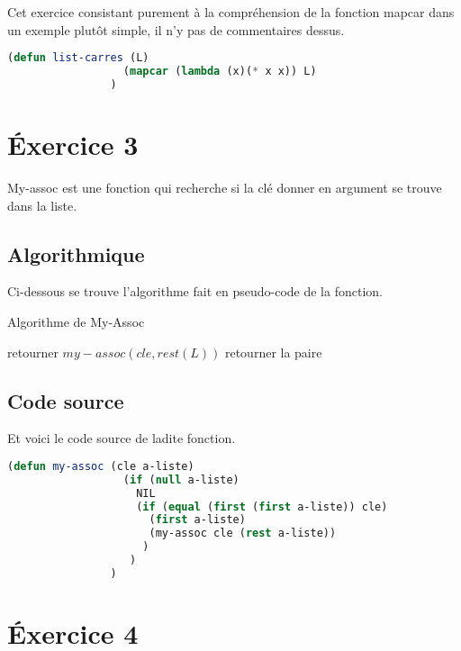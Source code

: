 \documentclass[a4paper, 12pt, leqno]{report}
\theoremstyle{plain}
\begin{document}
        Cet exercice consistant purement à la compréhension de la fonction mapcar dans un exemple plutôt simple, il n’y pas de commentaires dessus.
        
        \begin{lstlisting}[label=some-code,caption=list-carres (L) avec fonction lambda,language=lisp]
                (defun list-carres (L)
                  (mapcar (lambda (x)(* x x)) L)
                ) 
            \end{lstlisting}
        
        \chapter{\'Exercice 3}       
            My-assoc est une fonction qui recherche si la clé donner en argument se trouve dans la liste.
        \section{Algorithmique}
        Ci-dessous se trouve l'algorithme fait en pseudo-code de la fonction.
        \begin{algorithm}
            \caption{Algorithme de My-Assoc}
            \begin{algorithmic}
                    \State retourner $my-assoc(cle,rest(L))$
                \Else
                    \State retourner la paire
                \EndIf      
            \end{algorithmic}
            \end{algorithm}
            \section{Code source}
            Et voici le code source de ladite fonction.
            \begin{lstlisting}[label=some-code,caption=My\_{}Assoc (cle a-liste) version récusive,language=lisp]
                (defun my-assoc (cle a-liste)
                  (if (null a-liste)
                    NIL
                    (if (equal (first (first a-liste)) cle) 
                      (first a-liste) 
                      (my-assoc cle (rest a-liste))
                     )
                   )
                )
            \end{lstlisting} 
            \newpage
            \chapter{\'Exercice 4}
\end{document}
